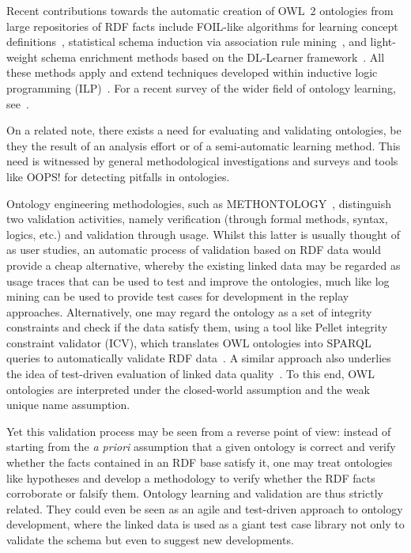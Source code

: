 \documentclass{llncs}
\begin{document}
Recent contributions towards the automatic creation of OWL~2 ontologies
from large repositories of RDF facts include
FOIL-like algorithms for learning concept definitions~\cite{FanizziDAmatoEsposito2008},
statistical schema induction via association rule mining~\cite{FleischhackerVoelkerStuckenschmidt2012},
and light-weight schema enrichment methods based on the DL-Learner
framework~\cite{HellmannLehmannAuer2009,BuehmannLehmann2012}.
All these methods apply and extend techniques developed within inductive logic programming
(ILP)~\cite{ILPat20}. For a recent survey of the wider field of ontology learning,
see~\cite{LehmannVoelker2014}.

On a related note, there exists a need for evaluating and validating ontologies,
be they the result of an analysis effort or of a semi-automatic learning method.
This need is witnessed by general methodological investigations
\cite{GangemiCatenacciCiaramitaLehmann2005,GangemiCatenacciCiaramitaLehmann2006}
and surveys \cite{TartirBudakArpinarSheth2007} and tools like OOPS! \cite{PovedaSuarezGomez2012}
for detecting pitfalls in ontologies.

Ontology engineering methodologies, such as METHONTOLOGY~\cite{FernandezGomezJuristo1997},
distinguish two validation activities, namely verification (through formal methods, syntax, logics, etc.)
and validation through usage. Whilst this latter is usually thought of as user studies,
an automatic process of validation based on RDF data would provide a cheap alternative,
whereby the existing linked data may be regarded as usage traces that can be used
to test and improve the ontologies, much like log mining can be used to provide
test cases for development in the replay approaches.
Alternatively, one may regard the ontology as a set of integrity constraints and check if the
data satisfy them, using a tool like Pellet integrity constraint validator (ICV),
which translates OWL ontologies into SPARQL queries to automatically validate RDF data~\cite{SirinTao2009}.
A similar approach also underlies the idea of test-driven evaluation of linked data 
quality~\cite{KontokostasWestphalAuerHellmannLehmannCornelissen2014}.
To this end, OWL ontologies are interpreted under the closed-world assumption and
the weak unique name assumption. 

Yet this validation process may be seen from a reverse point of view:
instead of starting from the \emph{a priori} assumption that a given ontology
is correct and verify whether the facts contained in an RDF base satisfy it,
one may treat ontologies like hypotheses and develop a methodology to verify
whether the RDF facts corroborate or falsify them. Ontology learning and validation
are thus strictly related.
They could even be seen as an agile and test-driven approach to ontology development,
where the linked data is used as a giant test case library not only to validate the
schema but even to suggest new developments.
\end{document}
